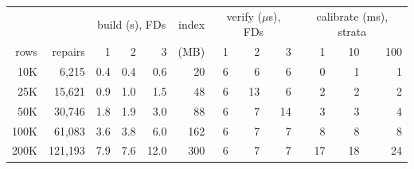 \begin{tabular}{@{}rr|rrr|r|rrr|rrr@{}}
\toprule
& & \multicolumn{3}{c|}{build (s), FDs} & index & \multicolumn{3}{c|}{verify ($\mu$s), FDs} & \multicolumn{3}{c}{calibrate (ms), strata} \\
rows & repairs & 1 & 2 & 3 & (MB) & 1 & 2 & 3 & 1 & 10 & 100 \\
\midrule
10K & 6,215 & 0.4 & 0.4 & 0.6 & 20 & 6 & 6 & 6 & 0 & 1 & 1 \\
25K & 15,621 & 0.9 & 1.0 & 1.5 & 48 & 6 & 13 & 6 & 2 & 2 & 2 \\
50K & 30,746 & 1.8 & 1.9 & 3.0 & 88 & 6 & 7 & 14 & 3 & 3 & 4 \\
100K & 61,083 & 3.6 & 3.8 & 6.0 & 162 & 6 & 7 & 7 & 8 & 8 & 8 \\
200K & 121,193 & 7.9 & 7.6 & 12.0 & 300 & 6 & 7 & 7 & 17 & 18 & 24 \\
\bottomrule
\end{tabular}
